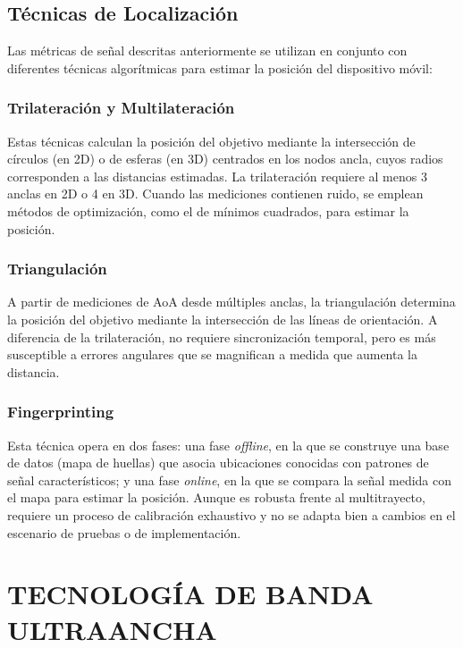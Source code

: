 \subsection{Técnicas de Localización}

Las métricas de señal descritas anteriormente se utilizan en conjunto con diferentes técnicas algorítmicas para estimar la posición del dispositivo móvil:

\subsubsection{Trilateración y Multilateración}

Estas técnicas calculan la posición del objetivo mediante la intersección de círculos (en 2D) o de esferas (en 3D) centrados en los nodos ancla, cuyos radios corresponden a las distancias estimadas. La trilateración requiere al menos 3 anclas en 2D o 4 en 3D. Cuando las mediciones contienen ruido, se emplean métodos de optimización, como el de mínimos cuadrados, para estimar la posición.

\subsubsection{Triangulación}

A partir de mediciones de AoA desde múltiples anclas, la triangulación determina la posición del objetivo mediante la intersección de las líneas de orientación. A diferencia de la trilateración, no requiere sincronización temporal, pero es más susceptible a errores angulares que se magnifican a medida que aumenta la distancia.

\subsubsection{Fingerprinting}

Esta técnica opera en dos fases: una fase \textit{offline}, en la que se construye una base de datos (mapa de huellas) que asocia ubicaciones conocidas con patrones de señal característicos; y una fase \textit{online}, en la que se compara la señal medida con el mapa para estimar la posición. Aunque es robusta frente al multitrayecto, requiere un proceso de calibración exhaustivo y no se adapta bien a cambios en el escenario de pruebas o de implementación.


\section{TECNOLOGÍA DE BANDA ULTRAANCHA}
\label{sec:tecnologia_uwb}

